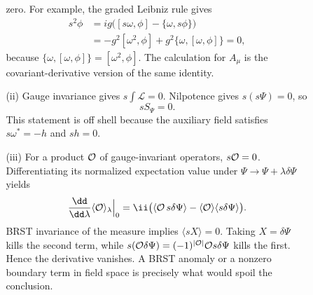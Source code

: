 \begin{enumerate}
\begin{enumerate}
\begin{enumerate}
      zero.  For example, the graded Leibniz rule gives
      \[
      \begin{split}
        s^2\phi
          &=ig\bigl([s\omega,\phi]-\{\omega,s\phi\}\bigr)\\
          &=-g^2[\omega^2,\phi]
            +g^2\{\omega,[\omega,\phi]\}=0,
      \end{split}
      \]
      because \(\{\omega,[\omega,\phi]\}=[\omega^2,\phi]\).  The
      calculation for \(A_\mu\) is the covariant-derivative version of the
      same identity.
      \item[(ii)] Gauge invariance gives \(s\int\mathcal L=0\).  Nilpotence
      gives \(s(s\Psi)=0\), so
      \[
        \boxed{sS_\Psi=0.}
      \]
      This statement is off shell because the auxiliary field satisfies
      \(s\omega^*=-h\) and \(sh=0\).
      \item[(iii)] For a product \({\cal O}\) of gauge-invariant operators,
      \(s{\cal O}=0\).  Differentiating its normalized expectation value
      under \(\Psi\to\Psi+\lambda\delta\Psi\) yields
      \[
        \frac{\dd}{\dd\lambda}\langle{\cal O}\rangle_\lambda\Big|_{0}
        =\ii\bigl(\langle{\cal O}\,s\delta\Psi\rangle
          -\langle{\cal O}\rangle\langle s\delta\Psi\rangle\bigr).
      \]
      BRST invariance of the measure implies \(\langle sX\rangle=0\).
      Taking \(X=\delta\Psi\) kills the second term, while
      \(s({\cal O}\delta\Psi)=(-1)^{|{\cal O}|}{\cal O}s\delta\Psi\)
      kills the first.  Hence the derivative vanishes.  A BRST anomaly or
      a nonzero boundary term in field space is precisely what would spoil
      the conclusion.
    \end{enumerate}
  \end{enumerate}


\end{enumerate}
